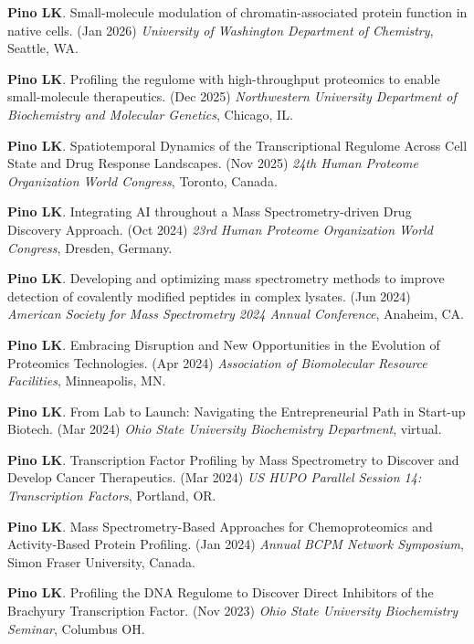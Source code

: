 \documentclass[11pt]{article}
\begin{document}
\begin{etaremune}

    \item \textbf{Pino LK}. Small-molecule modulation of chromatin-associated protein function in native cells. (Jan 2026) \textit{University of Washington Department of Chemistry}, Seattle, WA.

    \item \textbf{Pino LK}. Profiling the regulome with high-throughput proteomics to enable small-molecule therapeutics. (Dec 2025) \textit{Northwestern University Department of Biochemistry and Molecular Genetics}, Chicago, IL.

    \item \textbf{Pino LK}. Spatiotemporal Dynamics of the Transcriptional Regulome Across Cell State and Drug Response Landscapes. (Nov 2025) \textit{24th Human Proteome Organization World Congress}, Toronto, Canada.

    \item \textbf{Pino LK}. Integrating AI throughout a Mass Spectrometry-driven Drug Discovery Approach. (Oct 2024) \textit{23rd Human Proteome Organization World Congress}, Dresden, Germany.

    \item \textbf{Pino LK}. Developing and optimizing mass spectrometry methods to improve detection of covalently modified peptides in complex lysates. (Jun 2024) \textit{American Society for Mass Spectrometry 2024 Annual Conference}, Anaheim, CA.

    \item \textbf{Pino LK}. Embracing Disruption and New Opportunities in the Evolution of Proteomics Technologies. (Apr 2024) \textit{Association of Biomolecular Resource Facilities}, Minneapolis, MN.

    \item \textbf{Pino LK}. From Lab to Launch: Navigating the Entrepreneurial Path in Start-up Biotech. (Mar 2024) \textit{Ohio State University Biochemistry Department}, virtual.

    \item \textbf{Pino LK}. Transcription Factor Profiling by Mass Spectrometry to Discover and Develop Cancer Therapeutics. (Mar 2024) \textit{US HUPO Parallel Session 14: Transcription Factors}, Portland, OR.

    \item \textbf{Pino LK}. Mass Spectrometry-Based Approaches for Chemoproteomics and 
    Activity-Based Protein Profiling. (Jan 2024) \textit{Annual BCPM Network Symposium},
    Simon Fraser University, Canada.

    \item \textbf{Pino LK}. Profiling the DNA Regulome to Discover Direct Inhibitors of 
    the Brachyury Transcription Factor. (Nov 2023) \textit{Ohio State University 
    Biochemistry Seminar}, Columbus OH.

    
\end{etaremune}
\end{document}
